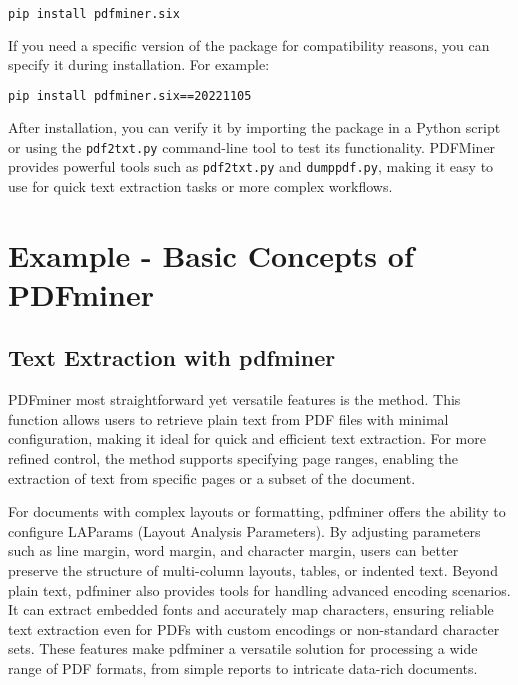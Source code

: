 \begin{lstlisting}[language=bash]
	pip install pdfminer.six
\end{lstlisting}

If you need a specific version of the package for compatibility reasons, you can specify it during installation. For example:

\begin{lstlisting}[language=bash]
	pip install pdfminer.six==20221105
\end{lstlisting}

After installation, you can verify it by importing the package in a Python script or using the \texttt{pdf2txt.py} command-line tool to test its functionality. PDFMiner provides powerful tools such as \texttt{pdf2txt.py} and \texttt{dumppdf.py}, making it easy to use for quick text extraction tasks or more complex workflows. \cite{Shinyama:2019}

\section{Example - Basic Concepts of PDFminer}

\subsection{Text Extraction with pdfminer}

PDFminer most straightforward yet versatile features is the  method. This function allows users to retrieve plain text from PDF files with minimal configuration, making it ideal for quick and efficient text extraction. For more refined control, the method supports specifying page ranges, enabling the extraction of text from specific pages or a subset of the document.

For documents with complex layouts or formatting, pdfminer offers the ability to configure LAParams (Layout Analysis Parameters). By adjusting parameters such as line margin, word margin, and character margin, users can better preserve the structure of multi-column layouts, tables, or indented text. Beyond plain text, pdfminer also provides tools for handling advanced encoding scenarios. It can extract embedded fonts and accurately map characters, ensuring reliable text extraction even for PDFs with custom encodings or non-standard character sets. These features make pdfminer a versatile solution for processing a wide range of PDF formats, from simple reports to intricate data-rich documents.\cite{MB20261:2023}

